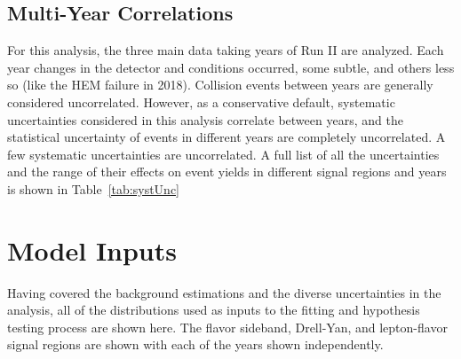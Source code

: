\subsection{Multi-Year Correlations}
For this analysis, the three main data taking years of Run II are analyzed. Each year changes in the detector and \LHC conditions occurred, some subtle, and others less so (like the HEM failure in 2018). Collision events between years are generally considered uncorrelated. However, as a conservative default, systematic uncertainties considered in this analysis correlate between years, and the statistical uncertainty of events in different years are completely uncorrelated. A few systematic uncertainties are uncorrelated. A full list of all the uncertainties and the range of their effects on event yields in different signal regions and years is shown in Table~\ref{tab:systUnc}


\section{Model Inputs}
Having covered the background estimations and the diverse uncertainties in the analysis, all of the distributions used as inputs to the fitting and hypothesis testing process are shown here. The flavor sideband, Drell-Yan, and lepton-flavor signal regions are shown with each of the years shown independently.

